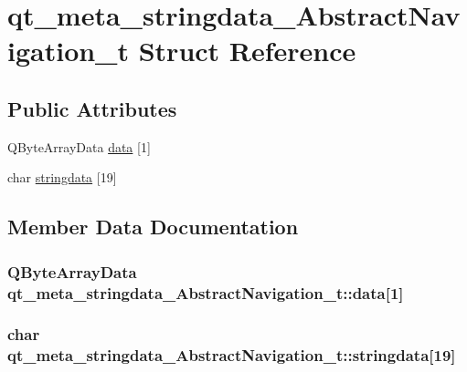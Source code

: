 \hypertarget{structqt__meta__stringdata___abstract_navigation__t}{\section{qt\+\_\+meta\+\_\+stringdata\+\_\+\+Abstract\+Navigation\+\_\+t Struct Reference}
\label{structqt__meta__stringdata___abstract_navigation__t}
}
\subsection*{Public Attributes}
\begin{DoxyCompactItemize}
\item 
Q\+Byte\+Array\+Data \hyperlink{structqt__meta__stringdata___abstract_navigation__t_a303364c881b5e00e431ca08d8689e910}{data} \mbox{[}1\mbox{]}
\item 
char \hyperlink{structqt__meta__stringdata___abstract_navigation__t_a91e6eaefed3314ad36ccf7f1afc8be11}{stringdata} \mbox{[}19\mbox{]}
\end{DoxyCompactItemize}


\subsection{Member Data Documentation}
\hypertarget{structqt__meta__stringdata___abstract_navigation__t_a303364c881b5e00e431ca08d8689e910}{
\subsubsection[{data}]{\setlength{\rightskip}{0pt plus 5cm}Q\+Byte\+Array\+Data qt\+\_\+meta\+\_\+stringdata\+\_\+\+Abstract\+Navigation\+\_\+t\+::data\mbox{[}1\mbox{]}}}\label{structqt__meta__stringdata___abstract_navigation__t_a303364c881b5e00e431ca08d8689e910}
\hypertarget{structqt__meta__stringdata___abstract_navigation__t_a91e6eaefed3314ad36ccf7f1afc8be11}{
\subsubsection[{stringdata}]{\setlength{\rightskip}{0pt plus 5cm}char qt\+\_\+meta\+\_\+stringdata\+\_\+\+Abstract\+Navigation\+\_\+t\+::stringdata\mbox{[}19\mbox{]}}}\label{structqt__meta__stringdata___abstract_navigation__t_a91e6eaefed3314ad36ccf7f1afc8be11}


